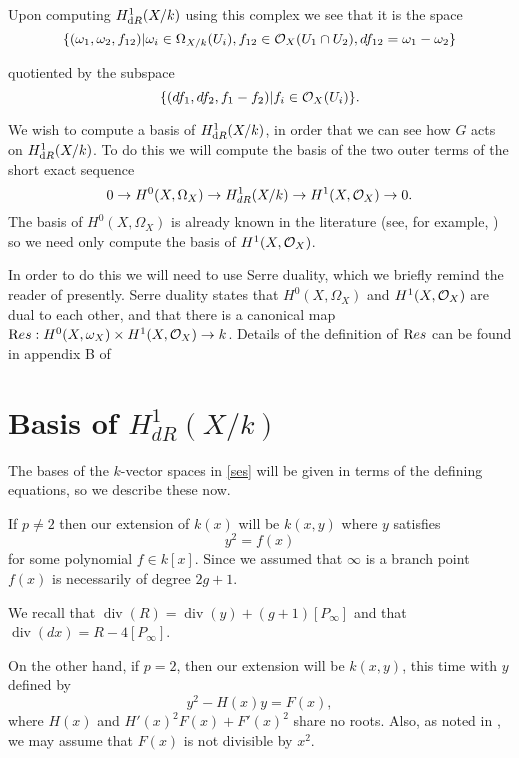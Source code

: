 \documentclass[draft, 11pt]{article} %
\theoremstyle{plain}
\theoremstyle{remark}
\newcommand{\cO}{{\cal O}}
\newcommand{\ra}{\rightarrow}
\DeclareMathOperator{\di}{div}
\begin{document}
Upon computing $H^1_{{\text dR}}(X/k)$ using this complex we see that it is the space
\begin{equation}\label{derhamconditions}
\{(\omega_1, \omega_2, f_{12}) | \omega_i\in \Omega_{X/k}(U_i), f_{12}\in \cO_X(U_1 \cap U_2), df_{12} = \omega_1 - \omega_2\}
\end{equation}

quotiented by the subspace
\[
\{ (df_1, df_2, f_1-f_2)|f_i \in \cO_X(U_i)\}.
\]

We wish to compute a basis of $H^1_{{\text dR}}(X/k)$, in order that we can see how $G$ acts on $H^1_{{\text dR}}(X/k)$.
To do this we will compute the basis of the two outer terms of the short exact sequence
\begin{equation}\label{ses}
0 \ra H^0(X,\Omega_X) \ra H^1_{dR}(X/k) \ra H^1(X,\cO_X) \ra 0.
\end{equation}
The basis of $H^0(X,\Omega_X)$ is already known in the literature (see, for example, \cite[Prop. 7.4.26]{liu}) so we need only compute the basis of $H^1(X,\cO_X)$.

In order to do this we will need to use Serre duality, which we briefly remind the reader of presently.
Serre duality states that $H^0(X,\Omega_X)$ and $H^1(X,\cO_X)$ are dual to each other, and that there is a canonical map ${\text Res}:H^0(X,\omega_X) \times H^1(X,\cO_X) \rightarrow k$.
Details of the definition of ${\text Res}$ can be found in appendix B of 

\section{Basis of $H^1_{dR}(X/k)$}

The bases of the $k$-vector spaces in \ref{ses} will be given in terms of the defining equations, so we describe these now.

If $p \neq 2$ then our extension of $k(x)$ will be $k(x,y)$ where $y$ satisfies
\[
y^2 = f(x)
\]
for some polynomial $f \in k[x]$.
Since we assumed that $\infty$ is a branch point $f(x)$ is necessarily of degree $2g+1$.

We recall that $\di (R) = \di(y) + (g+1)[P_\infty]$ and that $\di( dx) = R - 4[P_\infty]$.

On the other hand, if $p=2$, then our extension will be $k(x,y)$, this time with $y$ defined by
\[
y^2 - H(x)y = F(x),
\]
where $H(x)$ and $H'(x)^2F(x) + F'(x)^2$ share no roots.
Also, as noted in \cite[\S 6]{faithfulaction}, we may assume that $F(x)$ is not divisible by $x^2$.
\end{document}
